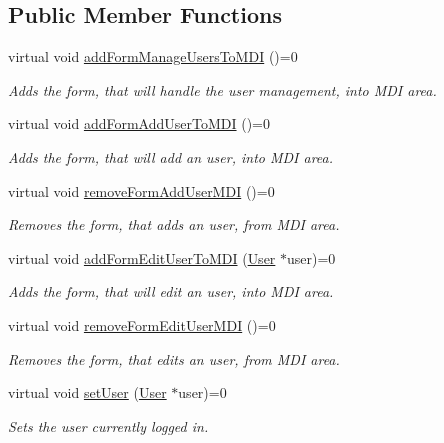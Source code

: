 \subsection*{\-Public \-Member \-Functions}
\begin{DoxyCompactItemize}
\item 
virtual void \hyperlink{class_i_main_window_af7659d4e738bd2b4519f01a7fc77a2fb}{add\-Form\-Manage\-Users\-To\-M\-D\-I} ()=0
\begin{DoxyCompactList}\small\item\em \-Adds the form, that will handle the user management, into \-M\-D\-I area. \end{DoxyCompactList}\item 
virtual void \hyperlink{class_i_main_window_abc38cea87c50d298c1d9dd39f507e580}{add\-Form\-Add\-User\-To\-M\-D\-I} ()=0
\begin{DoxyCompactList}\small\item\em \-Adds the form, that will add an user, into \-M\-D\-I area. \end{DoxyCompactList}\item 
virtual void \hyperlink{class_i_main_window_ab097fceace495ca6bfe9eac1bb374e36}{remove\-Form\-Add\-User\-M\-D\-I} ()=0
\begin{DoxyCompactList}\small\item\em \-Removes the form, that adds an user, from \-M\-D\-I area. \end{DoxyCompactList}\item 
virtual void \hyperlink{class_i_main_window_a8496779b5688e62e6887e8fa9f236a30}{add\-Form\-Edit\-User\-To\-M\-D\-I} (\hyperlink{class_user}{\-User} $\ast$user)=0
\begin{DoxyCompactList}\small\item\em \-Adds the form, that will edit an user, into \-M\-D\-I area. \end{DoxyCompactList}\item 
virtual void \hyperlink{class_i_main_window_afdebe819722a44e459fb6798ccb5cf1a}{remove\-Form\-Edit\-User\-M\-D\-I} ()=0
\begin{DoxyCompactList}\small\item\em \-Removes the form, that edits an user, from \-M\-D\-I area. \end{DoxyCompactList}\item 
virtual void \hyperlink{class_i_main_window_a611322565db0eb0985a025451a94c2fe}{set\-User} (\hyperlink{class_user}{\-User} $\ast$user)=0
\begin{DoxyCompactList}\small\item\em \-Sets the user currently logged in. \end{DoxyCompactList}\item 

\end{DoxyCompactItemize}
